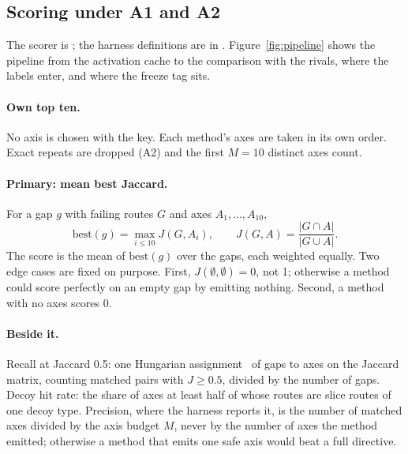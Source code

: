 \subsection{Scoring under A1 and A2}
\label{sec:scoring}

The scorer is ; the harness definitions are in
. Figure~\ref{fig:pipeline} shows the pipeline
from the activation cache to the comparison with the rivals, where the labels
enter, and where the freeze tag sits.



\paragraph{Own top ten.}
No axis is chosen with the key. Each method's axes are taken in its own order.
Exact repeats are dropped (A2) and the first $M=10$ distinct axes count.

\paragraph{Primary: mean best Jaccard.}
For a gap $g$ with failing routes $G$ and axes $A_1,\dots,A_{10}$,
\begin{equation}
  \text{best}(g) = \max_{i \le 10} J(G, A_i), \qquad
  J(G, A) = \frac{|G \cap A|}{|G \cup A|}.
\end{equation}
The score is the mean of $\text{best}(g)$ over the gaps, each weighted equally.
Two edge cases are fixed on purpose. First, $J(\emptyset, \emptyset) = 0$, not 1;
otherwise a method could score perfectly on an empty gap by emitting nothing.
Second, a method with no axes scores 0.

\paragraph{Beside it.}
Recall at Jaccard 0.5: one Hungarian assignment~\cite{kuhn1955hungarian} of gaps
to axes on the Jaccard matrix, counting matched pairs with $J \ge 0.5$, divided
by the number of gaps.
Decoy hit rate: the share of axes at least half of whose routes are slice
routes of one decoy type. Precision, where the harness reports it, is the number
of matched axes divided by the axis budget $M$, never by the number of axes the
method emitted; otherwise a method that emits one safe axis would beat a full
directive.

